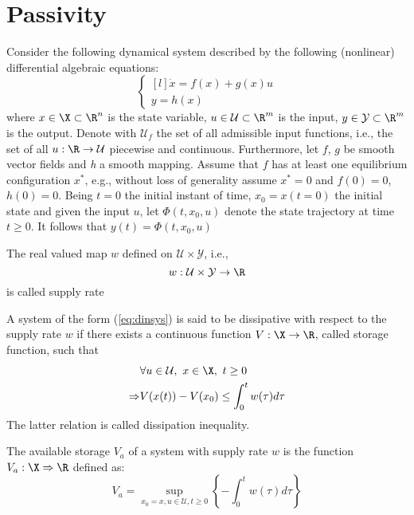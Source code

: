 \section{Passivity}
Consider the following dynamical system described by the following (nonlinear) differential algebraic equations:
%
\begin{equation}\label{eq:dinsys}
\left\{
\begin{matrix*}[l]
\dot{x}=f(x)+g(x)u\\
y= h(x)
\end{matrix*}
\right.
\end{equation}
%
where $x\in\X\subset\R^n$ is the state variable, $u\in\mathcal{U}\subset\R^m$ is the input, $y\in\mathcal{Y}\subset\R^m$ is the output. Denote with $\mathcal{U}_f$ the set of all admissible input functions, i.e., the set of all $u:\R\rightarrow\mathcal{U}$ piecewise and continuous. Furthermore, let $f$, $g$ be smooth vector fields and \textit{h} a smooth mapping. Assume that $f$ has at least one equilibrium configuration $x^*$, e.g., without loss of generality assume $x^*=0$ and $f(0)=0$, $h(0)=0$. Being $t=0$ the initial instant of time, $x_0 = x(t=0)$ the initial state and given the input $u$, let $\Phi(t,x_0,u)$ denote the state trajectory at time $t\geq0$. It follows that $y(t)=\Phi(t,x_0,u)$
%
\begin{defn}
	The real valued map $w$ defined on $\mathcal{U}\times\mathcal{Y}$, i.e.,
	\begin{equation*}
	w:\mathcal{U}\times\mathcal{Y}\rightarrow\R
	\end{equation*}
	is called supply rate
\end{defn}
%
\begin{defn}
	A system of the form (\ref{eq:dinsys}) is said to be dissipative with respect to the supply rate $w$ if there exists a continuous function $V:\X\rightarrow\R$, called storage function, such that
	\begin{align}
	&\forall u\in\mathcal{U},\text{ }x\in\X,\text{ }t\geq 0\nonumber\\\label{eq:dissipative}
	\Rightarrow& V(x(t))-V(x_0)\leq\int_{0}^{t}w(\tau)d\tau
	\end{align}
	The latter relation is called dissipation inequality.
\end{defn}
%
\begin{defn}
	The available storage $V_a$ of a system with supply rate $w$ is the function $V_a:\X\Rightarrow\R$ defined as:
	\begin{equation*}
	V_a=\sup\limits_{x_0=x,u\in\mathcal{U},t\geq 0}\left\{-\int_{0}^{t}w(\tau)d\tau\right\}
	\end{equation*}
\end{defn}

